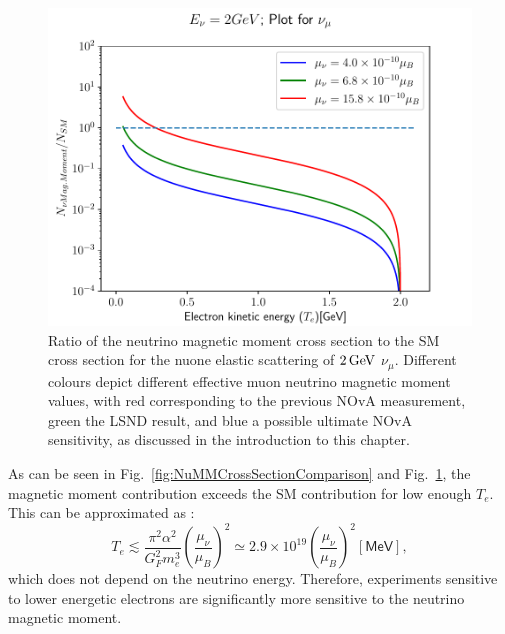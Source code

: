 \begin{figure}[hbtp]
\centering
\includegraphics[width=.9\textwidth]{Plots/NuMM/RatioNumuMMCompLinX.pdf}
\caption[Ratio of the neutrino magnetic moment and Standard Model cross sections]{Ratio of the neutrino magnetic moment cross section to the \acrshort{SM} cross section for the \acrshort{nuone} elastic scattering of $\unit[2]{GeV}$ $\nu_\mu$. Different colours depict different effective muon neutrino magnetic moment values, with red corresponding to the previous \acrshort{NOvA} measurement, green the LSND result, and blue a possible ultimate \acrshort{NOvA} sensitivity, as discussed in the introduction to this chapter.}
\label{fig:NuMMCrossSectionRatios}
\end{figure}

As can be seen in Fig.~\ref{fig:NuMMCrossSectionComparison} and Fig.~\ref{fig:NuMMCrossSectionRatios}, the magnetic moment contribution exceeds the \gls{SM} contribution for low enough $T_e$. This can be approximated as \cite{nuElmagInt2015.pdf}:
\begin{equation}
T_e\lesssim\frac{\pi^2\alpha^2}{G_F^2m_e^3}\left(\frac{\mu_{\nu}}{\mu_B}\right)^2\simeq 2.9\times 10^{19}\left(\frac{\mu_{\nu}}{\mu_B}\right)^2\left[\textsf{MeV}\right],
\end{equation}
which does not depend on the neutrino energy. Therefore, experiments sensitive to lower energetic electrons are significantly more sensitive to the neutrino magnetic moment.


